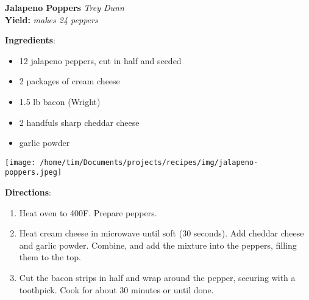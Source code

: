 \documentclass[11pt, twoside, openany]{book}
\begin{document}
\noindent\begin{minipage}[t]{\linewidth}%
{\Large\textbf{Jalapeno Poppers}} \label{jalapeno-poppers}\hfill\textit{Trey Dunn}\\
\textbf{Yield:} \textit{makes 24 peppers}\\
\noindent\begin{minipage}[t]{0.78\linewidth}%
\textbf{Ingredients}:\vspace{-3mm}
\begin{multicols}{2}
\begin{itemize}\setlength\itemsep{-1mm}
\item 12 jalapeno peppers, cut in half and seeded
\item 2 packages of cream cheese
\item 1.5 lb bacon (Wright)
\item 2 handfuls sharp cheddar cheese
\item garlic powder
\end{itemize}
\end{multicols}
\end{minipage}
\noindent\begin{minipage}[t]{0.18\linewidth}
\centering \strut\vspace*{-\baselineskip}\newline
\texttt{[image: /home/tim/Documents/projects/recipes/img/jalapeno-poppers.jpeg]}\\
\end{minipage}\vspace{3mm}
\textbf{Directions}:
\vspace{-3mm}\begin{enumerate}\setlength\itemsep{-1mm}
\item Heat oven to 400F. Prepare peppers.
\item Heat cream cheese in microwave until soft (30 seconds). Add cheddar cheese and garlic powder. Combine, and add the mixture into the peppers, filling them to the top.
\item Cut the bacon strips in half and wrap around the pepper, securing with a toothpick. Cook for about 30 minutes or until done.
\end{enumerate}
\end{minipage}\vspace{8mm}
\end{document}
